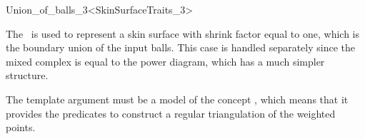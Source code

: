 
\begin{ccRefClass}{Union_of_balls_3<SkinSurfaceTraits_3>}
  \ccDefinition

  The \ccRefName\ is used to represent a skin surface with shrink
  factor equal to one, which is the boundary union of the input balls.
  This case is handled separately since the mixed complex is equal to
  the power diagram, which has a much simpler structure. 

  The template argument must be a model of the concept
  , which means that it provides the
  predicates to construct a regular triangulation of the weighted
  points.
  




  \ccIsModel {} 


\end{ccRefClass}
